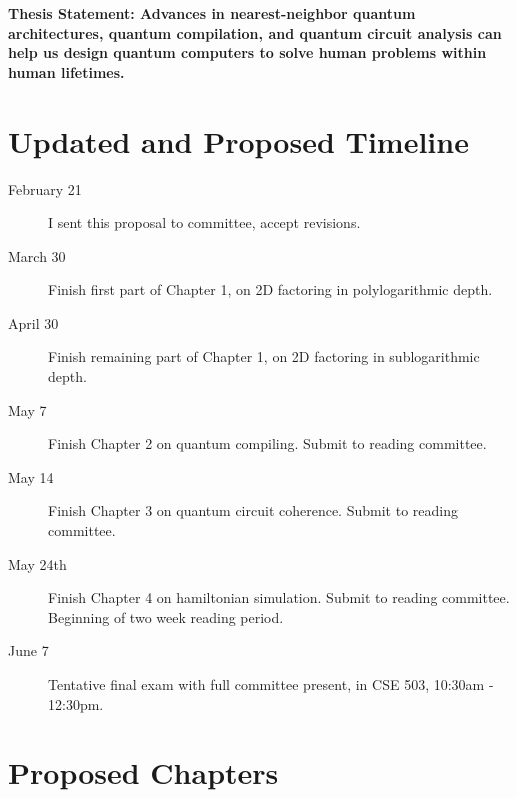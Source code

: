 \documentclass[]{article}
\theoremstyle{plain} \newtheorem{lemma}{Lemma}
\begin{document}
\textbf{Thesis Statement: Advances in nearest-neighbor quantum architectures,
quantum compilation, and quantum circuit analysis can help us design
quantum computers to solve human problems within human lifetimes.}

\pagebreak
\section{Updated and Proposed Timeline}

\begin{description}
\item[February 21]
I sent this proposal to committee, accept revisions.

\item[March 30]
Finish first part of Chapter 1, on 2D factoring in polylogarithmic
depth.

\item[April 30]
Finish remaining part of Chapter 1, on 2D factoring in sublogarithmic
depth.

\item[May 7]
Finish Chapter 2 on quantum compiling. Submit to reading committee.

\item[May 14]
Finish Chapter 3 on quantum circuit coherence.
Submit to reading committee.

\item[May  24th]
Finish Chapter 4 on hamiltonian simulation.
Submit to reading committee.
Beginning of two week reading period.

\item[June 7]
Tentative final exam with full committee present, in CSE 503, 10:30am - 12:30pm.

\end{description}

\section{Proposed Chapters}
\end{document}
